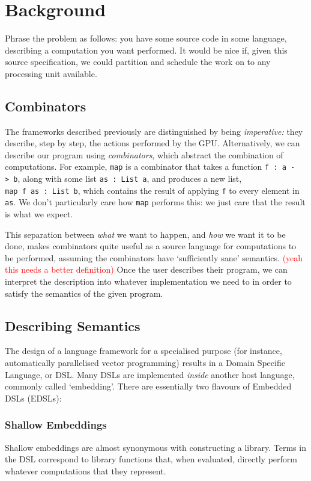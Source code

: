 \documentclass[a4paper,12pt]{article}
\newcommand{\red}[1]{\textcolor{red}{#1}}
\newcommand{\icf}[1]{\mbox{\texttt{#1}}}
\begin{document}
\section{Background}
Phrase the problem as follows: you have some source code in some language, describing a computation you want performed. 
It would be nice if, given this source specification, we could partition and schedule the work on to any processing unit available. 

\subsection{Combinators}
The frameworks described previously are distinguished by being \textit{imperative:} they describe, step by step, the actions performed by the GPU.
Alternatively, we can describe our program using \textit{combinators}, which abstract the combination of computations. 
For example, \icf{map} is a combinator that takes a function \icf{f\ :\  a\ ->\ b}, along with some list \icf{as\ :\ List\ a}, and produces a new list, \icf{map\ f\ as\ :\ List\ b}, which contains the result of applying \icf{f} to every element in \icf{as}. 
We don't particularly care how \icf{map} performs this: we just care that the result is what we expect.

This separation between \textit{what} we want to happen, and \textit{how} we want it to be done, makes combinators quite useful as a source language for computations to be performed, assuming the combinators have `sufficiently sane' semantics. 
\red{(yeah this needs a better definition)} 
Once the user describes their program, we can interpret the description into whatever implementation we need to in order to satisfy the semantics of the given program.

\subsection{Describing Semantics}
The design of a language framework for a specialised purpose (for instance, automatically parallelised vector programming) results in a Domain Specific Language, or DSL. 
Many DSLs are implemented \textit{inside} another host language, commonly called `embedding'. There are essentially two flavours of Embedded DSLs (EDSLs):

\subsubsection*{Shallow Embeddings} 
Shallow embeddings are almost synonymous with constructing a library. 
Terms in the DSL correspond to library functions that, when evaluated, directly perform whatever computations that they represent.
\end{document}
